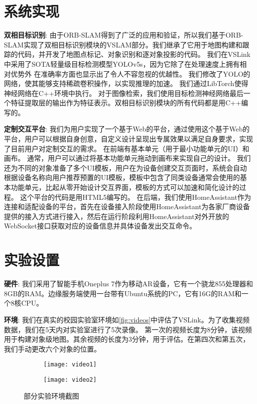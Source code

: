 \section{系统实现}
\textbf{双相目标识别}: 由于ORB-SLAM得到了广泛的应用和验证，所以我们基于ORB-SLAM\cite{CamElvRod20}实现了双相目标识别模块的VSLAM部分。我们继承了它用于地图构建和跟踪的代码，并开发了地图点标记、对象识别和逐对象投影的代码。
我们在VSLink中采用了SOTA轻量级目标检测模型YOLOv5s\cite{glenn_jocher_2020_4154370}，因为它除了在处理速度上拥有相对优势外 在准确率方面也显示出了令人不容忽视的优越性。
我们修改了YOLO的网络，使其能够支持稀疏卷积操作\cite{ren2018sbnet}，以实现推理的加速。
我们通过LibTorch使得神经网络在C++环境中执行。
对于图像检索，我们使用目标检测神经网络最后一个特征提取层的输出\cite{glenn_jocher_2020_4154370}作为特征表示。双相目标识别模块的所有代码都是用C++编写的。

\textbf{定制交互平台}: 我们为用户实现了一个基于Web的平台，通过使用这个基于Web的平台，用户可以根据自身创意，自定义设计呈现出专属效果以满足自身要求，实现了目前用户对定制交互的需求。
在前端有基本单元（用于最小功能单元的UI）和画布。
通常，用户可以通过将基本功能单元拖动到画布来实现自己的设计。
我们还为不同的对象准备了多个UI模板，用户在为设备创建交互页面时，系统会自动根据设备名称向用户推荐预置的UI模板，模板中包含了同类设备通常会使用的基本功能单元，比起从零开始设计交互界面，模板的方式可以加速和简化设计的过程。
这个平台的代码是用HTML5编写的。
在后端，我们使用HomeAssistant\cite{homeass}作为连接和适配设备的平台，首先在设备接入阶段使用HomeAssistant为各家厂商设备提供的接入方式进行接入，然后在运行阶段利用HomeAssistant对外开放的WebSocket接口获取对应的设备信息并具体设备发出交互命令。
\section{实验设置}
\textbf{硬件}: 我们采用了智能手机Oneplus 7作为移动AR设备，它有一个骁龙855处理器和8GB的RAM。边缘服务端使用一台带有Ubuntu系统的PC，它有16G的RAM和一个8核CPU。


\textbf{环境}: 我们在真实的校园实验室环境如\autoref{fig:videos}中评估了VSLink。为了收集视频数据，我们在5天内对实验室进行了5次录像。
第一次的视频长度为8分钟，该视频用于构建对象级地图。其余视频的长度为3分钟，用于评估。在第四次和第五次，我们手动更改六个对象的位置。

\begin{figure}[htbp]
	\centering
	\begin{subfigure}{.49\linewidth}
		\texttt{[image: video1]}
		\caption{}
	\end{subfigure}
	\begin{subfigure}{.49\linewidth}
		\texttt{[image: video2]}
		\caption{}
	\end{subfigure}
	\caption{部分实验环境截图}\label{fig:videos}
\end{figure}

